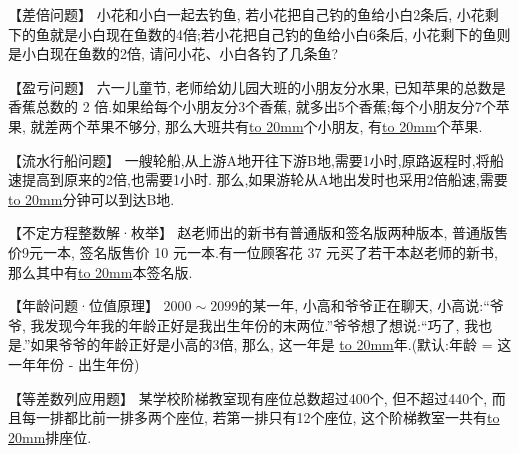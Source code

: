 \item {
    【差倍问题】
    小花和小白一起去钓鱼, 若小花把自己钓的鱼给小白2条后, 小花剩下的鱼就是小白现在鱼数的4倍;若小花把自己钓的鱼给小白6条后, 小花剩下的鱼则是小白现在鱼数的2倍, 请问小花、小白各钓了几条鱼?
    \vspace{2cm}
}

\item {
    【盈亏问题】
    六一儿童节, 老师给幼儿园大班的小朋友分水果, 已知苹果的总数是香蕉总数的 2 倍.如果给每个小朋友分3个香蕉, 就多出5个香蕉;每个小朋友分7个苹果, 就差两个苹果不够分, 那么大班共有\underline{\hbox to 20mm{}}个小朋友, 有\underline{\hbox to 20mm{}}个苹果.
    \vspace{2cm}
}

\item {
    【流水行船问题】
    一艘轮船,从上游A地开往下游B地,需要1小时,原路返程时,将船速提高到原来的2倍,也需要1小时. 那么,如果游轮从A地出发时也采用2倍船速,需要\underline{\hbox to 20mm{}}分钟可以到达B地.
    \vspace{2cm}
}

\item {
    【不定方程整数解·枚举】
    赵老师出的新书有普通版和签名版两种版本, 普通版售价9元一本, 签名版售价 10 元一本.有一位顾客花 37 元买了若干本赵老师的新书, 那么其中有\underline{\hbox to 20mm{}}本签名版.
    \vspace{2cm}
}

\item {
    【年龄问题·位值原理】
    $2000\sim 2099$的某一年, 小高和爷爷正在聊天, 小高说:``爷爷, 我发现今年我的年龄正好是我出生年份的末两位.''爷爷想了想说:``巧了, 我也是.''如果爷爷的年龄正好是小高的3倍, 那么, 这一年是  \underline{\hbox to 20mm{}}年.(默认:年龄 = 这一年年份 - 出生年份)
    \vspace{2cm}
}




\item {
    【等差数列应用题】
    某学校阶梯教室现有座位总数超过400个, 但不超过440个, 而且每一排都比前一排多两个座位, 若第一排只有12个座位, 这个阶梯教室一共有\underline{\hbox to 20mm{}}排座位.
    \vspace{2cm}
}



